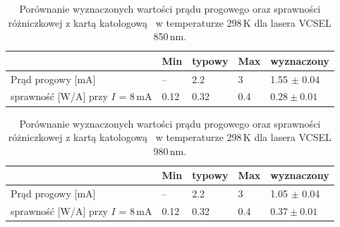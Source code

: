 \newpage
\begin{table}
\begin{center}
\label{tab:tabela1}
\caption{Porównanie wyznaczonych wartości  prądu progowego oraz sprawności różniczkowej z kartą katologową~\cite{spec_vcsel_850}
 w temperaturze 298\,K dla lasera VCSEL 850\,nm. }
\begin{tabular}{ | C{3.5cm}|  C{1.5cm} | C{1.5cm} | C{1.5cm}| C{3.5cm}|}
\hline
           &   Min  & typowy & Max   & wyznaczony        \\ \hline
Prąd progowy [mA] &  --    &  2.2    & 3    & 1.55 $\pm$ 0.04  \\ \hline
sprawność [W/A]  przy $I$ = 8\,mA   &  0.12   &  0.32   & 0.4   & $0.28\pm 0.01$      \\ \hline
\end{tabular}
\end{center}
\end{table}

\begin{table}
\begin{center}
\label{tab:tabela2}
\caption{Porównanie wyznaczonych wartości prądu progowego oraz sprawności różniczkowej z kartą katologową~\cite{spec_vcsel_980}
 w temperaturze 298\,K dla lasera VCSEL 980\,nm. }
\begin{tabular}{ | C{3.5cm}|  C{1.5cm} | C{1.5cm} | C{1.5cm}| C{3.5cm}|}
\hline
       &   Min  & typowy & Max   & wyznaczony        \\ \hline
Prąd progowy [mA] &  --    &  2.2    & 3    & 1.05 $\pm$ 0.04  \\ \hline
sprawność [W/A]  przy $I$ = 8\,mA   &  0.12   &  0.32   & 0.4   & $0.37 \pm 0.01$     \\ \hline
\end{tabular}
\end{center}
\end{table}

